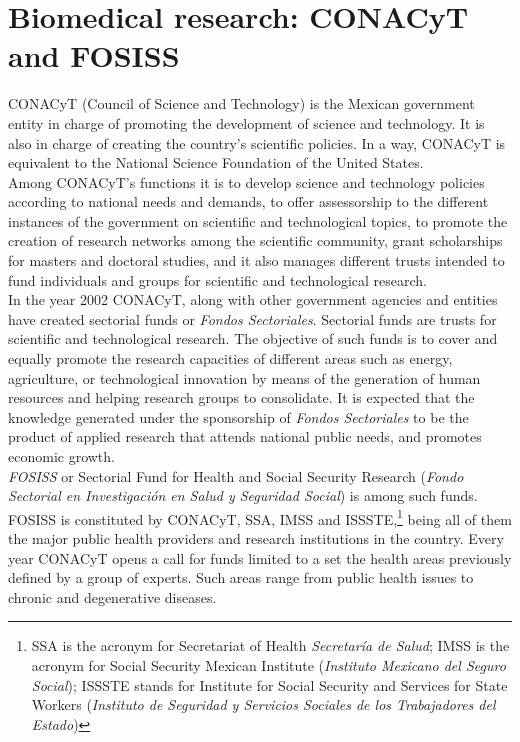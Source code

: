 \section{Biomedical research: CONACyT and FOSISS}
\label{sec:1}
CONACyT (Council of Science and Technology) is the Mexican government
entity in charge of promoting the development of science and 
technology. It is also in charge of creating the country's scientific
policies. In a way, CONACyT is equivalent to the National Science
Foundation of the United States.\\

Among CONACyT's functions it is to develop science and technology
policies according to national needs and demands, to offer
assessorship to the different instances of the government on
scientific and technological topics, to promote the creation of
research networks among the scientific community, grant scholarships
for masters and doctoral studies, and it also manages different trusts
intended to fund individuals and groups for scientific and
technological research.\\

In the year 2002 CONACyT, along with other government agencies and
entities have created sectorial funds or \emph{Fondos Sectoriales}.
Sectorial funds are trusts for scientific and technological research.
The objective of such funds is to cover and equally promote the
research capacities of different areas such as energy, agriculture, or
technological innovation by means of the generation of human resources
and helping research groups to consolidate. It is expected that the
knowledge generated under the sponsorship of \emph{Fondos Sectoriales}
to be the product of applied research that attends national public
needs, and promotes economic growth.\\

\emph{FOSISS} or Sectorial Fund for Health and Social Security
Research (\emph{Fondo Sectorial en Investigaci\'on en Salud y
  Seguridad Social}) is among such funds. FOSISS is constituted by
CONACyT, SSA, IMSS and ISSSTE,\footnote{SSA is the acronym for
  Secretariat of Health \emph{Secretar\'ia de Salud}; IMSS is the
  acronym for Social Security Mexican Institute (\emph{Instituto
    Mexicano del Seguro Social}); ISSSTE stands for Institute for
  Social Security and Services for State Workers (\emph{Instituto de
    Seguridad y Servicios Sociales de los Trabajadores del Estado})}
being all of them the major public health providers and research
institutions in the country. Every year CONACyT opens a call for funds
limited to a set the health areas previously defined by a group of
experts. Such areas range from public health issues to chronic and
degenerative diseases.\\

